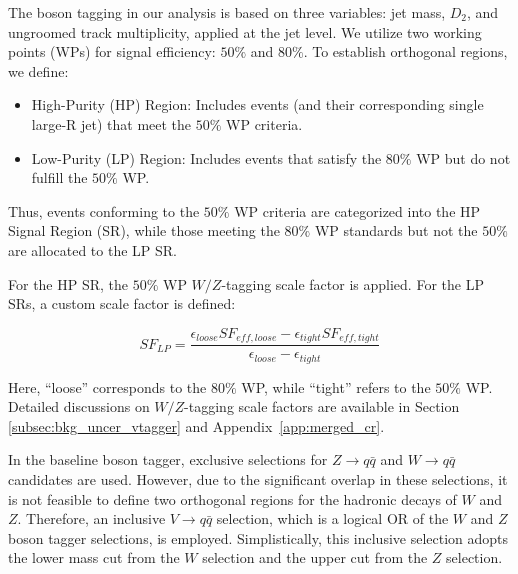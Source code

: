 The boson tagging in our analysis is based on three variables: jet mass, $D_2$, and ungroomed track multiplicity, applied at the jet level. We utilize two working points (WPs) for signal efficiency: $50\%$ and $80\%$. To establish orthogonal regions, we define:
\begin{itemize}
    \item High-Purity (HP) Region: Includes events (and their corresponding single large-R jet) that meet the $50\%$ WP criteria.
    \item Low-Purity (LP) Region: Includes events that satisfy the $80\%$ WP but do not fulfill the $50\%$ WP.
\end{itemize}
Thus, events conforming to the $50\%$ WP criteria are categorized into the HP Signal Region (SR), while those meeting the $80\%$ WP standards but not the $50\%$ are allocated to the LP SR.

For the HP SR, the $50\%$ WP $W/Z$-tagging scale factor is applied. For the LP SRs, a custom scale factor is defined:

    \begin{equation}
    SF_{LP} = \frac{\epsilon_{loose}SF_{eff,loose}- \epsilon_{tight}SF_{eff,tight} }{ \epsilon_{loose}- \epsilon_{tight}}
    \end{equation}

Here, ``loose'' corresponds to the $80\%$ WP, while ``tight'' refers to the $50\%$ WP. Detailed discussions on $W/Z$-tagging scale factors are available in Section \ref{subsec:bkg_uncer_vtagger} and Appendix~\ref{app:merged_cr}.

In the baseline boson tagger, exclusive selections for $Z \to q\bar{q}$ and $W \to q\bar{q}$ candidates are used. However, due to the significant overlap in these selections, it is not feasible to define two orthogonal regions for the hadronic decays of $W$ and $Z$. Therefore, an inclusive $V \to q\bar{q}$ selection, which is a logical OR of the $W$ and $Z$ boson tagger selections, is employed. Simplistically, this inclusive selection adopts the lower mass cut from the $W$ selection and the upper cut from the $Z$ selection.

